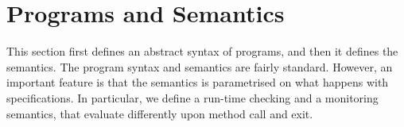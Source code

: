 \section{Programs and Semantics}\label{SecProgram}

This section first defines an abstract syntax of programs, and then it
defines the semantics. The program syntax and semantics are fairly
standard. However, an important feature is that the semantics is
parametrised on what happens with specifications. In particular, we
define a run-time checking and a monitoring semantics, that evaluate
differently upon method call and exit.


